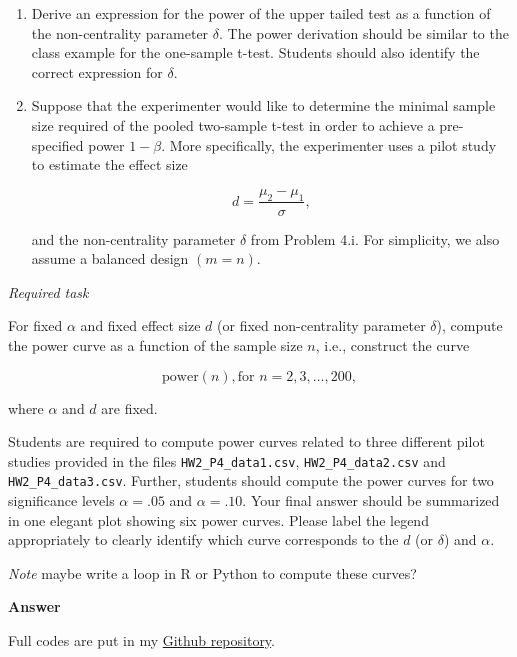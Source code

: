 \documentclass[letterpaper]{article}
\begin{document}
		\begin{enumerate}
			
			\item[i] Derive an expression for the power of the upper tailed test as a function of the non-centrality parameter $\delta$. The power derivation should be similar to the class example for the one-sample t-test. Students should also identify the correct expression for $\delta$.
			
			\item[ii] Suppose that the experimenter would like to determine the minimal sample size required of the pooled two-sample t-test in order to achieve a pre-specified power $1-\beta$. More specifically, the experimenter uses a pilot study to estimate the effect size
			
			\[
			d=\frac{\mu_2-\mu_1}{\sigma},
			\]
			
			and the non-centrality parameter $\delta$ from Problem 4.i. For simplicity, we also assume a balanced design $(m=n)$.
			
		\end{enumerate}
		
		\medskip
		
		\emph{Required task}
		
		\medskip
		
		For fixed $\alpha$ and fixed effect size $d$ (or fixed non-centrality parameter $\delta$), compute the power curve as a function of the sample size $n$, i.e., construct the curve
		
		\[
		\text{power}(n),  \text{for } n=2,3,\dots,200,
		\]
		
		where $\alpha$ and $d$ are fixed.
		
		Students are required to compute power curves related to three different pilot studies provided in the files \texttt{HW2\_P4\_data1.csv}, \texttt{HW2\_P4\_data2.csv} and \texttt{HW2\_P4\_data3.csv}. Further, students should compute the power curves for two significance levels $\alpha=.05$ and $\alpha=.10$. Your final answer should be summarized in one elegant plot showing six power curves. Please label the legend appropriately to clearly identify which curve corresponds to the $d$ (or $\delta$) and $\alpha$.
		
		\medskip
		
		\emph{Note} maybe write a loop in R or Python to compute these curves?
		
		\textbf{Answer}
		
		Full codes are put in my \href{https://github.com/zongyiliu/STAT_5291/tree/main/Homework/Homework_2}{Github repository}.
		
\end{document}
